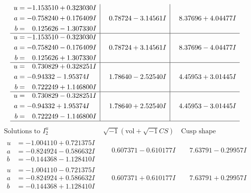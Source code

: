 \documentclass[1p]{elsarticle_modified}
\theoremstyle{definition}
\newcommand{\I}{\sqrt{-1}}
\begin{document}
$$\begin{array}{c|c|c}
\begin{aligned}
u &= -1.153510 + 0.323030 I \\
a &= -0.758240 + 0.176409 I \\
b &= \phantom{-}0.125626 - 1.307330 I\end{aligned}
 & \phantom{-}0.78724 - 3.14561 I & \phantom{-}8.37696 + 4.04477 I \\ \hline\begin{aligned}
u &= -1.153510 - 0.323030 I \\
a &= -0.758240 - 0.176409 I \\
b &= \phantom{-}0.125626 + 1.307330 I\end{aligned}
 & \phantom{-}0.78724 + 3.14561 I & \phantom{-}8.37696 - 4.04477 I \\ \hline\begin{aligned}
u &= \phantom{-}0.730829 + 0.328251 I \\
a &= -0.94332 - 1.95374 I \\
b &= \phantom{-}0.722249 + 1.146800 I\end{aligned}
 & \phantom{-}1.78640 - 2.52540 I & \phantom{-}4.45953 + 3.01445 I \\ \hline\begin{aligned}
u &= \phantom{-}0.730829 - 0.328251 I \\
a &= -0.94332 + 1.95374 I \\
b &= \phantom{-}0.722249 - 1.146800 I\end{aligned}
 & \phantom{-}1.78640 + 2.52540 I & \phantom{-}4.45953 - 3.01445 I\\
 \hline 
 \end{array}$$\newpage$$\begin{array}{c|c|c}  
\text{Solutions to }I^u_{2}& \I (\text{vol} + \sqrt{-1}CS) & \text{Cusp shape}\\
 \hline 
\begin{aligned}
u &= -1.004110 + 0.721375 I \\
a &= -0.824924 - 0.586632 I \\
b &= -0.144368 - 1.128410 I\end{aligned}
 & \phantom{-}0.607371 - 0.610177 I & \phantom{-}7.63791 - 0.29957 I \\ \hline\begin{aligned}
u &= -1.004110 - 0.721375 I \\
a &= -0.824924 + 0.586632 I \\
b &= -0.144368 + 1.128410 I\end{aligned}
 & \phantom{-}0.607371 + 0.610177 I & \phantom{-}7.63791 + 0.29957 I \\ \hline\begin{aligned}

\end{aligned}
\end{array}$$
\end{document}

